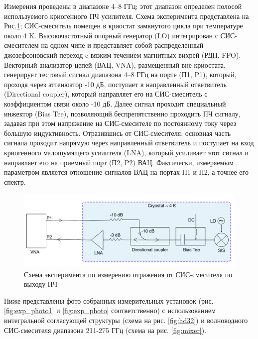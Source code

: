 \documentclass[a4paper]{article}
\begin{document}
Измерения проведены в диапазоне 4–8 ГГц; этот диапазон определен полосой используемого криогенного ПЧ усилителя. Схема эксперимента представлена на Рис.\ref{pic-setup}; 
СИС-смеситель помещен в криостат замкнутого цикла при температуре около 4 K. Высокочастотный опорный генератор (LO) интегрирован с СИС-смесителем на одном 
чипе и представляет собой распределенный джозефсоновский переход c вязким течением магнитных вихрей (РДП, FFO).  Векторный анализатор цепей (ВАЦ, VNA), 
размещенный вне криостата, генерирует тестовый сигнал диапазона 4–8 ГГц на порте (П1, P1), который, проходя через аттенюатор -10 дБ, поступает в направленный 
ответвитель (Directional coupler), который направляет его на СИС-смеситель с коэффициентом связи около -10 дБ. Далее сигнал проходит специальный инжектор (Bias Tee), 
позволяющий беспрепятственно проходить ПЧ сигналу, задавая при этом напряжение на СИС-смесителе по постоянному току через большую индуктивность. 
Отразившись от СИС-смесителя, основная часть сигнала проходит напрямую через направленный ответвитель и поступает на вход криогенного малошумящего усилителя (LNA), 
который усиливает этот сигнал и направляет его на приемный порт (П2, P2) ВАЦ. Фактически, измеряемым параметром является отношение сигналов ВАЦ на портах П1 и П2, а точнее его спектр.

\begin{figure}[H]
    \begin{center}
        \includegraphics[scale=0.5]{setup.png}
        \caption{Схема эксперимента по измерению отражения от СИС-смесителя по выходу ПЧ}
        \label{pic-setup}
    \end{center}
\end{figure}

Ниже представлены фото собранных измерительных установок (рис. \ref{fig:exp_photo1} и \ref{fig:exp_photo} соответственно) с использованием интегральной согласующей структуры (схема на рис. \ref{fig:hd32}) и волноводного СИС-смесителя диапазона 211-275 ГГц (схема на рис. \ref{fig:mixer}).
\end{document}
